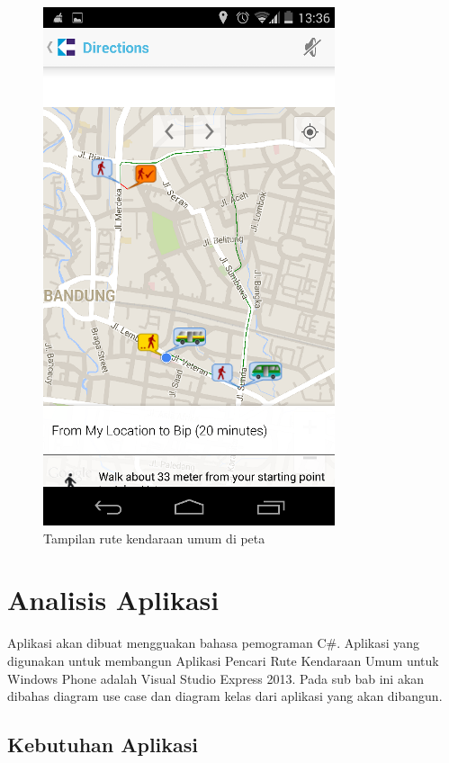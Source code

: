 \begin{figure}[h]
	\centering
		\includegraphics[scale=0.5]{Gambar/KIRI_Android/tampilan_peta}
	\caption{Tampilan rute kendaraan umum di peta}
	\label{fig:peta}
\end{figure}

\clearpage

\section{Analisis Aplikasi}
\label{lab:Analisis Aplikasi}
\hspace{0.5cm} Aplikasi akan dibuat mengguakan bahasa pemograman C\#. Aplikasi yang digunakan untuk membangun Aplikasi Pencari Rute Kendaraan Umum untuk Windows Phone adalah Visual Studio Express 2013. Pada sub bab ini akan dibahas diagram use case dan diagram kelas dari aplikasi yang akan dibangun. 

\subsection{Kebutuhan Aplikasi}
\label{lab:Kebutuhan Aplikasi}

